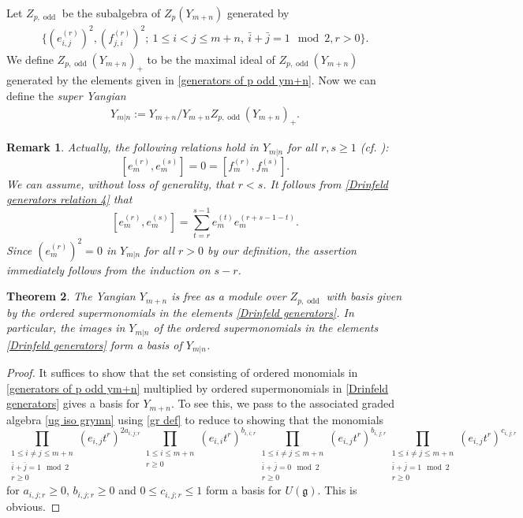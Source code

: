 \documentclass[12pt,reqno]{amsart}
\newcommand{\fg}{\mathfrak{g}}
\DeclareMathOperator{\odd}{odd}
\numberwithin{equation}{section}
\newtheorem{Theorem}{Theorem}[section]
\newtheorem{Remark}[Theorem]{Remark}
\theoremstyle{Theorem}
\theoremstyle{remark}
\numberwithin{equation}{section}
\begin{document}
Let $Z_{p,\odd}$ be the subalgebra of $Z_p(Y_{m+n})$ generated by
\begin{align}\label{generators of p odd ym+n}
\{(e_{i,j}^{(r)})^2, (f_{j,i}^{(r)})^2;~1\leq i<j\leq m+n,~\bar i+\bar j=1\!\!\!\!\! \mod 2, r>0\}.
\end{align}
We define $Z_{p,\odd}(Y_{m+n})_+$ to be the maximal ideal of $Z_{p,\odd}(Y_{m+n})$ generated by the elements given in \eqref{generators of p odd ym+n}.
Now we can define the {\it super Yangian}
\begin{align}\label{definition of ym|n}
Y_{m|n}:=Y_{m+n}/Y_{m+n}Z_{p,\odd}(Y_{m+n})_+. 
\end{align}
\begin{Remark}
Actually, the following relations hold in $Y_{m|n}$ for all $r,s\geq 1$ (cf. \cite[(41)]{Gow07}):
\[
[e_{m}^{(r)},e_{m}^{(s)}]=0=[f_{m}^{(r)},f_{m}^{(s)}].   
\]
We can assume, without loss of generality, that $r<s$.
It follows from \eqref{Drinfeld generators relation 4} that
\[
[e_{m}^{(r)},e_{m}^{(s)}]=\sum\limits_{t=r}^{s-1}e_m^{(t)}e_m^{(r+s-1-t)}.    
\]
Since $(e_m^{(r)})^2=0$ in $Y_{m|n}$ for all $r>0$ by our definition,
the assertion immediately follows from the induction on $s-r$.
\end{Remark}
\begin{Theorem}\label{theorem: PBW theorem for ym|n}
The Yangian $Y_{m+n}$ is free as a module over $Z_{p,\odd}$ with basis given by the ordered supermonomials in the elements \eqref{Drinfeld generators}.
In particular, the images in $Y_{m|n}$ of the ordered supermonomials in the elements \eqref{Drinfeld generators} form a basis of $Y_{m|n}$.
\end{Theorem}
\begin{proof}
It suffices to show that the set consisting of ordered monomials in \eqref{generators of p odd ym+n} multiplied by ordered supermonomials in \eqref{Drinfeld generators} gives a basis for $Y_{m+n}$.
To see this,
we pass to the associated graded algebra \eqref{ug iso grymn} using \eqref{gr def} to reduce to showing that the monomials
\[
\prod_{\substack{1\leq i\neq j\leq m+n\\ \bar i+\bar j=1\!\!\!\!\! \mod 2\\r \geq 0}}
(e_{i,j}t^r)^{2a_{i,j;r}}
\prod_{\substack{1 \leq i\leq m+n\\r \geq 0}}
(e_{i,i}t^r)^{b_{i,i;r}}
\prod_{\substack{1\leq i\neq j\leq m+n\\ \bar i+\bar j=0\!\!\!\!\! \mod 2\\r \geq 0}}
(e_{i,j}t^r)^{b_{i,j;r}}
\prod_{\substack{1\leq i\neq j\leq m+n\\ \bar i+\bar j=1\!\!\!\!\! \mod 2\\r \geq 0}}
(e_{i,j}t^r)^{c_{i,j;r}}
\]
for $a_{i,j;r}\geq 0$, $b_{i,j;r}\geq 0$ and $0\leq c_{i,j;r}\leq 1$ form a basis for $U(\fg)$.
This is obvious.
\end{proof}
\end{document}
